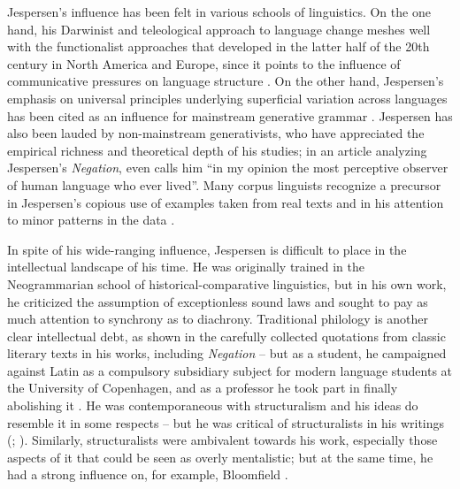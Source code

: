 \documentclass[output=chapter]{langscibook}
\begin{document}
Jespersen’s influence has been felt in various schools of linguistics. On the one hand, his Darwinist and teleological approach to language change \citep[see][]{Nielsen1989HF,McCawley1992} meshes well with the functionalist approaches that developed in the latter half of the 20th century in North America and Europe, since it points to the influence of communicative pressures on language structure \citep[1--5]{Givon1995}. On the other hand, Jespersen’s emphasis on universal principles underlying superficial variation across languages has been cited as an influence for mainstream generative grammar \citep[e.g.][]{Chomsky1975}. Jespersen has also been lauded by non-mainstream generativists, who have appreciated the empirical richness and theoretical depth of his studies; in an article analyzing Jespersen’s \textit{Negation}, \citet[37]{McCawley1995} even calls him ``in my opinion the most perceptive observer of human language who ever lived''. Many corpus linguists recognize a precursor in Jespersen’s copious use of examples taken from real texts and in his attention to minor patterns in the data \citep[4--5]{Meyer2008}.

In spite of his wide-ranging influence, Jespersen is difficult to place in the intellectual landscape of his time. He was originally trained in the Neogrammarian school of historical\hyp comparative linguistics, but in his own work, he criticized the assumption of exceptionless sound laws \citep[344--345]{HovdhaugenEtAl2000} and sought to pay as much %
attention to synchrony as to diachrony. Traditional philology is another clear intellectual debt, as shown in the carefully collected quotations from classic literary texts in his works, including \textit{Negation} -- but as a student, he campaigned against Latin as a compulsory subsidiary subject for modern language students at the University of Copenhagen, and as a professor he took part in finally abolishing it \citep[7]{Christophersen1989}. He was contemporaneous with structuralism and his ideas do resemble it in some respects -- but he was critical of %
structuralists in his writings (\cite[346]{HovdhaugenEtAl2000}; \cite[119--132]{Koerner1999}). Similarly, structuralists were ambivalent towards his work, especially those aspects of it that could be seen as overly mentalistic; but at the same time, he had a strong influence on, for example, Bloomfield \citep[see][]{Falk1992}.
\end{document}

